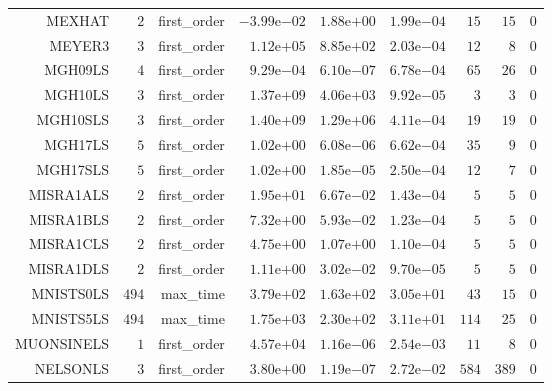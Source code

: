 \begin{longtable}{rrrrrrrrr}
MEXHAT & \(     2\) & first\_order & \(-3.99\)e\(-02\) & \( 1.88\)e\(+00\) & \( 1.99\)e\(-04\) & \(    15\) & \(    15\) & \(     0\) \\
MEYER3 & \(     3\) & first\_order & \( 1.12\)e\(+05\) & \( 8.85\)e\(+02\) & \( 2.03\)e\(-04\) & \(    12\) & \(     8\) & \(     0\) \\
MGH09LS & \(     4\) & first\_order & \( 9.29\)e\(-04\) & \( 6.10\)e\(-07\) & \( 6.78\)e\(-04\) & \(    65\) & \(    26\) & \(     0\) \\
MGH10LS & \(     3\) & first\_order & \( 1.37\)e\(+09\) & \( 4.06\)e\(+03\) & \( 9.92\)e\(-05\) & \(     3\) & \(     3\) & \(     0\) \\
MGH10SLS & \(     3\) & first\_order & \( 1.40\)e\(+09\) & \( 1.29\)e\(+06\) & \( 4.11\)e\(-04\) & \(    19\) & \(    19\) & \(     0\) \\
MGH17LS & \(     5\) & first\_order & \( 1.02\)e\(+00\) & \( 6.08\)e\(-06\) & \( 6.62\)e\(-04\) & \(    35\) & \(     9\) & \(     0\) \\
MGH17SLS & \(     5\) & first\_order & \( 1.02\)e\(+00\) & \( 1.85\)e\(-05\) & \( 2.50\)e\(-04\) & \(    12\) & \(     7\) & \(     0\) \\
MISRA1ALS & \(     2\) & first\_order & \( 1.95\)e\(+01\) & \( 6.67\)e\(-02\) & \( 1.43\)e\(-04\) & \(     5\) & \(     5\) & \(     0\) \\
MISRA1BLS & \(     2\) & first\_order & \( 7.32\)e\(+00\) & \( 5.93\)e\(-02\) & \( 1.23\)e\(-04\) & \(     5\) & \(     5\) & \(     0\) \\
MISRA1CLS & \(     2\) & first\_order & \( 4.75\)e\(+00\) & \( 1.07\)e\(+00\) & \( 1.10\)e\(-04\) & \(     5\) & \(     5\) & \(     0\) \\
MISRA1DLS & \(     2\) & first\_order & \( 1.11\)e\(+00\) & \( 3.02\)e\(-02\) & \( 9.70\)e\(-05\) & \(     5\) & \(     5\) & \(     0\) \\
MNISTS0LS & \(   494\) & max\_time & \( 3.79\)e\(+02\) & \( 1.63\)e\(+02\) & \( 3.05\)e\(+01\) & \(    43\) & \(    15\) & \(     0\) \\
MNISTS5LS & \(   494\) & max\_time & \( 1.75\)e\(+03\) & \( 2.30\)e\(+02\) & \( 3.11\)e\(+01\) & \(   114\) & \(    25\) & \(     0\) \\
MUONSINELS & \(     1\) & first\_order & \( 4.57\)e\(+04\) & \( 1.16\)e\(-06\) & \( 2.54\)e\(-03\) & \(    11\) & \(     8\) & \(     0\) \\
NELSONLS & \(     3\) & first\_order & \( 3.80\)e\(+00\) & \( 1.19\)e\(-07\) & \( 2.72\)e\(-02\) & \(   584\) & \(   389\) & \(     0\) \\

\end{longtable}
